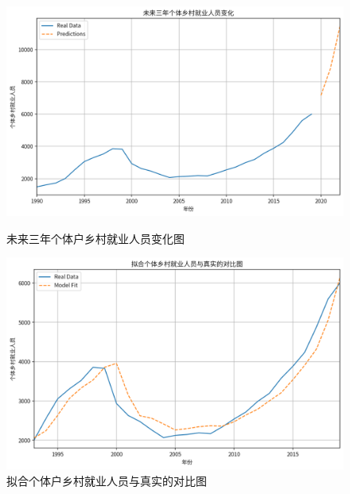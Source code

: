\begin{figure}[H]
    \centering
    \begin{minipage}{0.45\linewidth}
        \centering
        \includegraphics[width=\linewidth]{figures/24.png}
        \caption{未来三年个体户乡村就业人员变化图}
        \label{fig:prediction_self_employed}
    \end{minipage}\hfill
    \begin{minipage}{0.45\linewidth}
        \centering
        \includegraphics[width=\linewidth]{figures/25.png}
        \caption{拟合个体户乡村就业人员与真实的对比图}
        \label{fig:fit-vs-real_self_employed}
    \end{minipage}
\end{figure}

